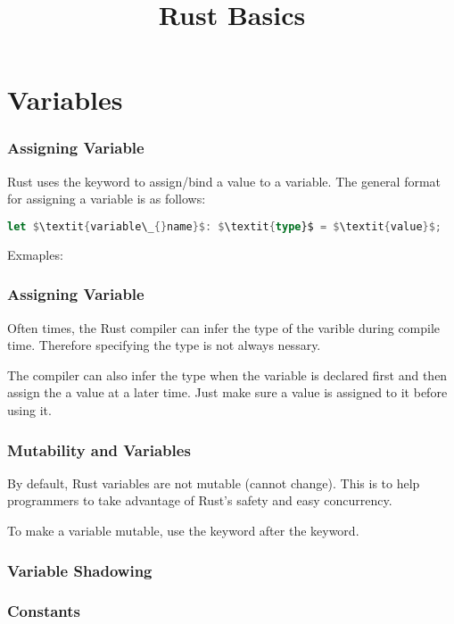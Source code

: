 \documentclass{beamer}
\title{Rust Basics}
\begin{document}
\begin{frame}
  \titlepage{}
\end{frame}

\section{Variables}
\begin{frame}[fragile]
  \frametitle{Assigning Variable}
  Rust uses the  keyword to assign/bind a value to a variable. The general format for assigning a variable is as follows:

\begin{lstlisting}[mathescape=true, language=Rust]
let $\textit{variable\_{}name}$: $\textit{type}$ = $\textit{value}$;
\end{lstlisting}

  Exmaples:
  
\end{frame}

\begin{frame}[fragile]
  \frametitle{Assigning Variable}
  Often times, the Rust compiler can infer the type of the varible during compile time. Therefore specifying the type is not always nessary.
  

  The compiler can also infer the type when the variable is declared first and then assign the a value at a later time. Just make sure a value is assigned to it before using it.
  
\end{frame}

\begin{frame}
  \frametitle{Mutability and Variables}
  By default, Rust variables are not mutable (cannot change). This is to help programmers to take advantage of Rust's safety and easy concurrency.
  

  To make a variable mutable, use the  keyword after the  keyword.
  
\end{frame}

\begin{frame}
  \frametitle{Variable Shadowing}
\end{frame}

\begin{frame}
  \frametitle{Constants}
\end{frame}
\end{document}
